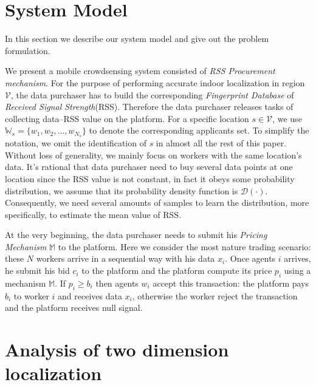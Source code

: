 \documentclass[10pt,conference,compsocconf,letterpaper]{IEEEtran}
\begin{document}
\section{System Model}\label{sysmodel}
In this section we describe our system model and give out the problem formulation.

We present a mobile crowdsensing system consisted of \emph{RSS Procurement mechanism}. For the purpose of performing accurate indoor localization in region $\mathcal{V}$, the data purchaser has to build the corresponding \emph{Fingerprint Database} of \emph{Received Signal Strength}(RSS). Therefore the data purchaser releases tasks of collecting data--RSS value on the platform. For a specific location $s\in \mathcal{V}$, we use $\mathds{W}_s=\{w_1,w_2,...,w_{N_s}\}$ to denote the corresponding applicants set. To simplify the notation, we omit the identification of $s$ in almost all the rest of this paper. Without loss of generality, we mainly focus on workers with the same location's data. It's rational that data purchaser need to buy several data points at one location since the RSS value is not constant, in fact it obeys some probability distribution, we assume that its probability density function is $\mathcal{D}(\cdot)$. Consequently, we need several amounts of samples to learn the distribution, more specifically, to estimate the mean value of RSS.

At the very beginning, the data purchaser needs to submit his \emph{Pricing Mechanism} $\mathbb{M}$ to the platform. Here we consider the most nature trading scenario: these $N$ workers arrive in a sequential way with his data $x_i$. Once agents $i$ arrives, he submit his bid $c_i$ to the platform and the platform compute its price $p_i$ using a mechanism $\mathbb{M}$. If $p_i\geq b_i$ then agents $w_i$ accept this transaction: the platform pays $b_i$ to worker $i$ and receives data $x_i$, otherwise the worker reject the transaction and the platform receives null signal.

\section{Analysis of two dimension localization}
\end{document}
